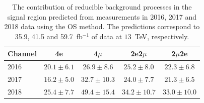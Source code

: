 


\begin{table}[h]
\begin{center}
     \begin{tabular}{| l | c | c | c | c |} \hline
Channel	& 4e 	           & 4$\mu$          & 2e2$\mu$        & 2$\mu$2e        \\ \hline \hline
2016    & $ 20.1 \pm 6.1 $ & $26.9 \pm 8.6$ & $25.2 \pm 8.0$  & $22.3 \pm 6.8$  \\ 
2017    & $ 16.2 \pm 5.0 $ & $32.7 \pm 10.3$ & $24.0 \pm 7.7$  & $21.3 \pm 6.5$  \\ 
2018    & $ 25.4 \pm 7.7 $ & $49.4 \pm 15.4$ & $34.2 \pm 10.7$ & $33.0 \pm 10.0$ \\ \hline 
 	\end{tabular}
\end{center}
    \caption{ The contribution of reducible background
    processes in the signal region predicted from measurements in 2016, 2017 and 2018 data
    using the OS method. The predictions correspond to 35.9, 41.5 and 59.7~fb$^{-1}$ of data at $13$~TeV, respectively.}
     \label{tab:reducibleMethodA}
\end{table}
